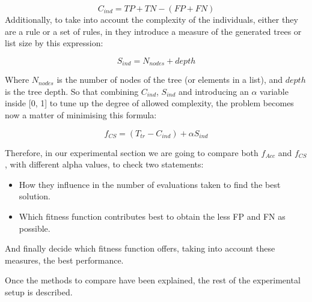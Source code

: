 \documentclass[runningheads]{llncs}
\begin{document}
\begin{equation}
\label{eq:coverage}
C_{ind} = TP + TN - (FP + FN)
\end{equation}
Additionally, to take into account the complexity of the individuals,
either they are a rule or a set of rules, in \cite{witten2005data}
they introduce a measure of the generated trees or list size by this
expression: 

\begin{equation}
S_{ind} = N_{nodes} + depth
\end{equation}

Where $N_{nodes}$ is the number of nodes of the tree (or elements in a list), and $depth$ is the tree depth. So that combining $C_{ind}$, $S_{ind}$ and introducing an $\alpha$ variable inside [0, 1] to tune up the degree of allowed complexity, the problem becomes now a matter of minimising this formula:

\begin{equation}
\label{eq:complexFitness}
f_{CS} = (T_{tr} - C_{ind}) + \alpha S_{ind}
\end{equation}

Therefore, in our experimental section we are going to compare both
$f_{Acc}$ and $f_{CS}$, with different  alpha values, to check two statements:

\begin{itemize}
	\item How they influence in the number of evaluations taken to find the best solution.
	\item Which fitness function contributes best to obtain the less FP and FN as possible.
\end{itemize}

And finally decide which fitness function offers, taking into account these measures, the best performance. 



\label{sec:experiments}

Once the methods to compare have been explained, the rest of the experimental setup is described.
\end{document}
